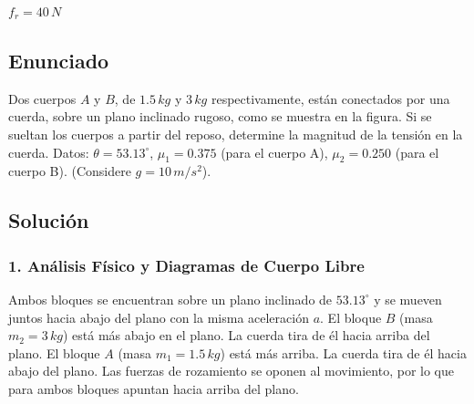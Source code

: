 \documentclass[12pt, a4paper]{article}
\begin{document}
\begin{tcolorbox}[colback=green!5!white, colframe=green!50!black, title=Respuesta Final]
\centering \Large $f_r = 40 \, \si{N}$
\end{tcolorbox}

\newpage

\subsection*{Enunciado}
Dos cuerpos $A$ y $B$, de $1.5 \, \si{kg}$ y $3 \, \si{kg}$ respectivamente, están conectados por una cuerda, sobre un plano inclinado rugoso, como se muestra en la figura. Si se sueltan los cuerpos a partir del reposo, determine la magnitud de la tensión en la cuerda. 
Datos: $\theta = 53.13^\circ$, $\mu_1 = 0.375$ (para el cuerpo A), $\mu_2 = 0.250$ (para el cuerpo B). (Considere $g=10\,\si{m/s^2}$).

\begin{center}
\end{center}

\subsection*{Solución}

\subsubsection*{1. Análisis Físico y Diagramas de Cuerpo Libre}
Ambos bloques se encuentran sobre un plano inclinado de $53.13^\circ$ y se mueven juntos hacia abajo del plano con la misma aceleración $a$.
El bloque $B$ (masa $m_2 = 3 \, \si{kg}$) está más abajo en el plano. La cuerda tira de él hacia arriba del plano.
El bloque $A$ (masa $m_1 = 1.5 \, \si{kg}$) está más arriba. La cuerda tira de él hacia abajo del plano.
Las fuerzas de rozamiento se oponen al movimiento, por lo que para ambos bloques apuntan hacia arriba del plano.
\end{document}
